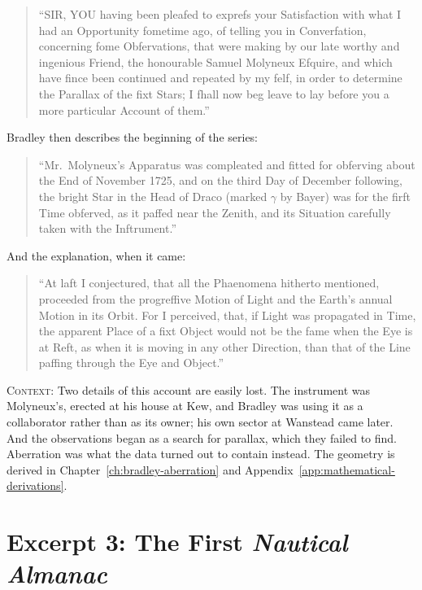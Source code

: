 \begin{quote}
``SIR, YOU having been pleafed to exprefs your Satisfaction with what I had an Opportunity fometime ago, of telling you in Converfation, concerning fome Obfervations, that were making by our late worthy and ingenious Friend, the honourable Samuel Molyneux Efquire, and which have fince been continued and repeated by my felf, in order to determine the Parallax of the fixt Stars; I fhall now beg leave to lay before you a more particular Account of them.''
\end{quote}

Bradley then describes the beginning of the series:

\begin{quote}
``Mr.~Molyneux's Apparatus was compleated and fitted for obferving about the End of November 1725, and on the third Day of December following, the bright Star in the Head of Draco (marked $\gamma$ by Bayer) was for the firft Time obferved, as it paffed near the Zenith, and its Situation carefully taken with the Inftrument.''
\end{quote}

And the explanation, when it came:

\begin{quote}
``At laft I conjectured, that all the Phaenomena hitherto mentioned, proceeded from the progreffive Motion of Light and the Earth's annual Motion in its Orbit. For I perceived, that, if Light was propagated in Time, the apparent Place of a fixt Object would not be the fame when the Eye is at Reft, as when it is moving in any other Direction, than that of the Line paffing through the Eye and Object.''
\end{quote}

\noindent\textsc{Context}: Two details of this account are easily lost. The instrument was Molyneux's, erected at his house at Kew, and Bradley was using it as a collaborator rather than as its owner; his own sector at Wanstead came later. And the observations began as a search for parallax, which they failed to find. Aberration was what the data turned out to contain instead. The geometry is derived in Chapter~\ref{ch:bradley-aberration} and Appendix~\ref{app:mathematical-derivations}.

\medskip

\section{Excerpt 3: The First \emph{Nautical Almanac}}

